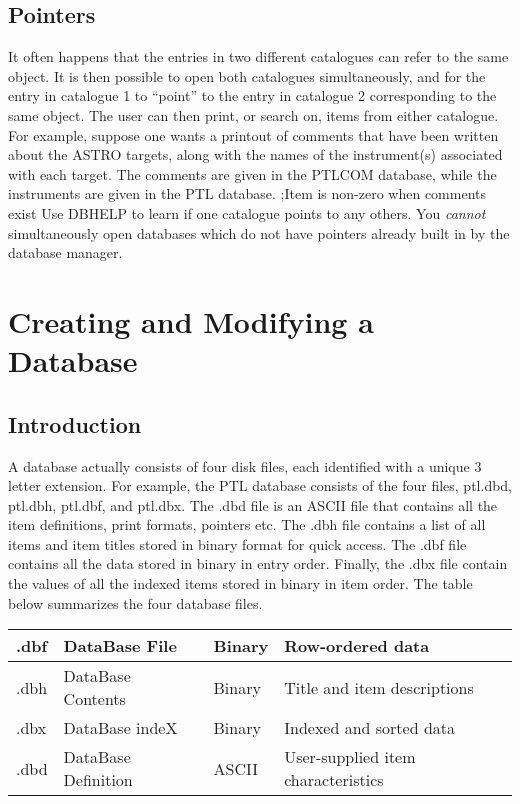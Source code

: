 \subsection{Pointers}
It often happens that the entries in two different catalogues can
refer to the same object.   It is then possible to open both catalogues
simultaneously, and for the entry in catalogue 1 to ``point'' to the
entry in catalogue 2 corresponding to the same object.  The user can
then print, or search on, items from either catalogue.
For example, suppose one wants a printout of comments that have been
written about the ASTRO targets, along with the names of the instrument(s)
associated with each target.  The comments are given in the PTLCOM database,
while the instruments are given in the PTL database.
\exbegin
{}
 {;Item is non-zero when comments exist}
\exend
Use DBHELP to learn if one catalogue points to any others.  
You {\em cannot} simultaneously open databases which do not have pointers
already built in by the database manager.
\section{Creating and Modifying a Database}
\subsection{Introduction}
A database actually consists of four disk files, each identified
with a unique 3 letter extension.  For example, the PTL database
consists of the four files, ptl.dbd, ptl.dbh, ptl.dbf, and ptl.dbx.
The .dbd file is an ASCII file that contains all the item definitions,
print formats, pointers etc.  The .dbh file contains a list of all items
and item titles stored in binary format for quick access.  The .dbf
file contains all the data stored in binary in entry order.  Finally,
the .dbx file contain the values of all the indexed items stored in
binary in item order.   The table below summarizes the four database
files.       \\

\vspace{0.1in}
\begin{tabular}{|l|l|l|l|}  \hline
.dbf & DataBase File & Binary & Row-ordered data \\ \hline
.dbh & DataBase Contents & Binary & Title and item descriptions \\ \hline
.dbx & DataBase indeX & Binary & Indexed and sorted data  \\  \hline
.dbd & DataBase Definition & ASCII & User-supplied item characteristics \\
\hline
\end{tabular}
\vspace{0.2in}

